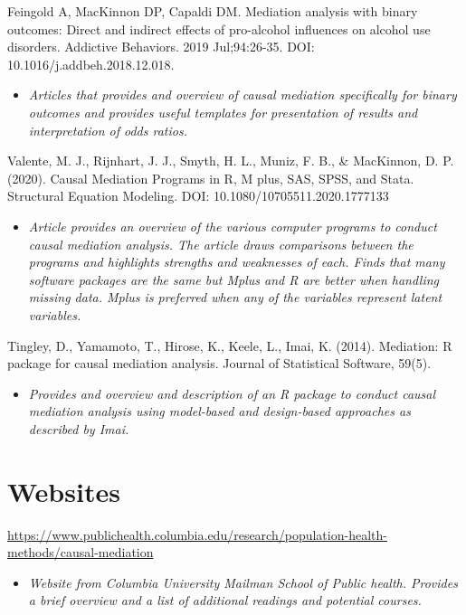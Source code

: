 \documentclass[
]{book}
\providecommand{\tightlist}{%
  \setlength{\itemsep}{0pt}\setlength{\parskip}{0pt}}
\begin{document}
Feingold A, MacKinnon DP, Capaldi DM. Mediation analysis with binary outcomes: Direct and indirect effects of pro-alcohol influences on alcohol use disorders. Addictive Behaviors. 2019 Jul;94:26-35. DOI: 10.1016/j.addbeh.2018.12.018.

\begin{itemize}
\tightlist
\item
  \emph{Articles that provides and overview of causal mediation specifically for binary outcomes and provides useful templates for presentation of results and interpretation of odds ratios.}
\end{itemize}

Valente, M. J., Rijnhart, J. J., Smyth, H. L., Muniz, F. B., \& MacKinnon, D. P. (2020). Causal Mediation Programs in R, M plus, SAS, SPSS, and Stata. Structural Equation Modeling. DOI: 10.1080/10705511.2020.1777133

\begin{itemize}
\tightlist
\item
  \emph{Article provides an overview of the various computer programs to conduct causal mediation analysis. The article draws comparisons between the programs and highlights strengths and weaknesses of each. Finds that many software packages are the same but Mplus and R are better when handling missing data. Mplus is preferred when any of the variables represent latent variables.}
\end{itemize}

Tingley, D., Yamamoto, T., Hirose, K., Keele, L., Imai, K. (2014). Mediation: R package for causal mediation analysis. Journal of Statistical Software, 59(5).

\begin{itemize}
\tightlist
\item
  \emph{Provides and overview and description of an R package to conduct causal mediation analysis using model-based and design-based approaches as described by Imai.}
\end{itemize}

\section{Websites}\label{websites-3}

\url{https://www.publichealth.columbia.edu/research/population-health-methods/causal-mediation}

\begin{itemize}
\tightlist
\item
  \emph{Website from Columbia University Mailman School of Public health. Provides a brief overview and a list of additional readings and potential courses.}
\end{itemize}
\end{document}
